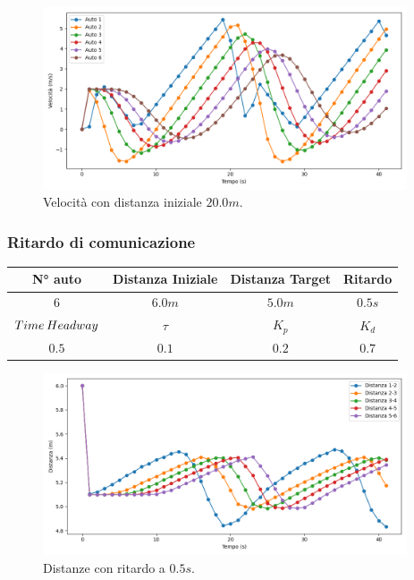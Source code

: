 \begin{figure}[H]
    \includegraphics[width=0.96\textwidth]{images/5-experiment/car-spacing/velocity_20.png}
    \caption{Velocità con distanza iniziale $20.0 m$.}
    \label{fig:20-space-velocity}
\end{figure}
\vspace*{\fill}
\newpage


\subsubsection{Ritardo di comunicazione}
\vspace*{\fill}
\begin{table}[h]
    \centering
    \begin{tabular}{|c|c|c|c|}
        \hline
        N° auto & Distanza Iniziale & Distanza Target & Ritardo \\
        \hline
        $6$ & $6.0 m$ & $5.0 m$ & $0.5 s$ \\
        \hline
        $Time\hspace{0.2em}Headway$ & $\tau$ & $K_p$ & $K_d$  \\
        \hline
        $0.5$ & $0.1$ & $0.2$ & $0.7$ \\
        \hline
    \end{tabular}
\end{table}

\begin{figure}[H]
    \includegraphics[width=0.96\textwidth]{images/5-experiment/delay/distance_0,5.png}
    \caption{Distanze con ritardo a $0.5 s$.}
    \label{fig:0.5-delay-distance}
\end{figure}

